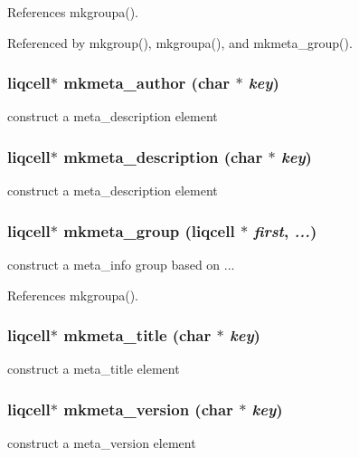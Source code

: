 References mkgroupa().

Referenced by mkgroup(), mkgroupa(), and mkmeta\_\-group().
\subsubsection[{mkmeta\_\-author}]{\setlength{\rightskip}{0pt plus 5cm}liqcell$\ast$ mkmeta\_\-author (char $\ast$ {\em key})}\label{df/dca/liqcell__mk__star_8h_8a68e85c9acc5a45fa9751fde4f100ae}


construct a meta\_\-description element 
\subsubsection[{mkmeta\_\-description}]{\setlength{\rightskip}{0pt plus 5cm}liqcell$\ast$ mkmeta\_\-description (char $\ast$ {\em key})}\label{df/dca/liqcell__mk__star_8h_d7e5ab2e14c9c333db98885676c62a79}


construct a meta\_\-description element 
\subsubsection[{mkmeta\_\-group}]{\setlength{\rightskip}{0pt plus 5cm}liqcell$\ast$ mkmeta\_\-group (liqcell $\ast$ {\em first}, \/   {\em ...})}\label{df/dca/liqcell__mk__star_8h_d8f914b6b726606c9c952149d0bc4266}


construct a meta\_\-info group based on ... 

References mkgroupa().
\subsubsection[{mkmeta\_\-title}]{\setlength{\rightskip}{0pt plus 5cm}liqcell$\ast$ mkmeta\_\-title (char $\ast$ {\em key})}\label{df/dca/liqcell__mk__star_8h_0607d834c2a4ebc0117888c5b072d46a}


construct a meta\_\-title element 
\subsubsection[{mkmeta\_\-version}]{\setlength{\rightskip}{0pt plus 5cm}liqcell$\ast$ mkmeta\_\-version (char $\ast$ {\em key})}\label{df/dca/liqcell__mk__star_8h_c895cc20f7fe59dbc6f58ee03a5135e6}


construct a meta\_\-version element 